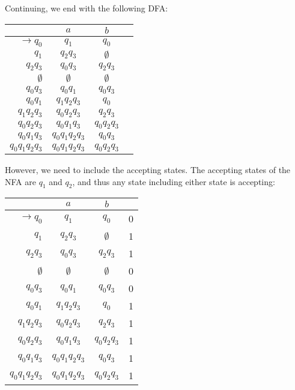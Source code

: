Continuing, we end with the following DFA:

\begin{center}\begin{tabular}{r|c c r}
         & $a$ & $b$ & \\\hline
    $\to q_0$ & $q_1$ & $q_0$ &  \\
          $q_1$ & $q_2q_3$ & $\emptyset$ & \\
          $q_2q_3$ & $q_0q_3$ & $q_2q_3$ & \\
          $\emptyset$ & $\emptyset$ & $\emptyset$ &\\
          $q_0q_3$ & $q_0q_1$ & $q_0q_3$ & \\
          $q_0q_1$ & $q_1q_2q_3$ & $q_0$ & \\
          $q_1q_2q_3$ & $q_0q_2q_3$ & $q_2q_3$ & \\
          $q_0q_2q_3$ & $q_0q_1q_3$ & $q_0q_2q_3$ & \\
          $q_0q_1q_3$ & $q_0q_1q_2q_3$ & $q_0q_3$ & \\
          $q_0q_1q_2q_3$ & $q_0q_1q_2q_3$ & $q_0q_2q_3$ & \\
\end{tabular}\end{center}

However, we need to include the accepting states. The accepting states of the NFA are $q_1$ and $q_2$, and thus any state including either state is accepting:

\begin{center}\begin{tabular}{r|c c r}
         & $a$ & $b$ & \\\hline
    $\to q_0$ & $q_1$ & $q_0$ & 0 \\
          $q_1$ & $q_2q_3$ & $\emptyset$ & 1 \\
          $q_2q_3$ & $q_0q_3$ & $q_2q_3$ & 1 \\
          $\emptyset$ & $\emptyset$ & $\emptyset$ & 0\\
          $q_0q_3$ & $q_0q_1$ & $q_0q_3$ & 0 \\
          $q_0q_1$ & $q_1q_2q_3$ & $q_0$ & 1 \\
          $q_1q_2q_3$ & $q_0q_2q_3$ & $q_2q_3$ & 1 \\
          $q_0q_2q_3$ & $q_0q_1q_3$ & $q_0q_2q_3$ & 1 \\
          $q_0q_1q_3$ & $q_0q_1q_2q_3$ & $q_0q_3$ & 1 \\
          $q_0q_1q_2q_3$ & $q_0q_1q_2q_3$ & $q_0q_2q_3$ & 1\\
\end{tabular}\end{center}


